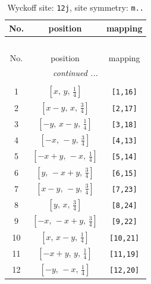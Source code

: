 \documentclass[fleqn,8pt]{jsarticle}
\begin{document}
\begin{longtable}{ccc}
\caption{Wyckoff site: {\tt 12j}, site symmetry: {\tt m..}}
 \\
 \hline \hline
No. & position & mapping \\ \hline \endfirsthead

\multicolumn{2}{l}{\tablename\ \thetable{}} \\
 \hline \hline
No. & position & mapping \\ \hline \endhead

 \hline \hline
\multicolumn{2}{r}{\footnotesize\it continued ...} \\ \endfoot

 \hline \hline
\multicolumn{2}{r}{} \\ \endlastfoot

1 & $\left[ x,\, y,\, \frac{1}{4} \right]$ & {\tt [1,16]} \\ \hline
2 & $\left[ x - y,\, x,\, \frac{3}{4} \right]$ & {\tt [2,17]} \\ \hline
3 & $\left[ - y,\, x - y,\, \frac{1}{4} \right]$ & {\tt [3,18]} \\ \hline
4 & $\left[ - x,\, - y,\, \frac{3}{4} \right]$ & {\tt [4,13]} \\ \hline
5 & $\left[ - x + y,\, - x,\, \frac{1}{4} \right]$ & {\tt [5,14]} \\ \hline
6 & $\left[ y,\, - x + y,\, \frac{3}{4} \right]$ & {\tt [6,15]} \\ \hline
7 & $\left[ x - y,\, - y,\, \frac{3}{4} \right]$ & {\tt [7,23]} \\ \hline
8 & $\left[ y,\, x,\, \frac{3}{4} \right]$ & {\tt [8,24]} \\ \hline
9 & $\left[ - x,\, - x + y,\, \frac{3}{4} \right]$ & {\tt [9,22]} \\ \hline
10 & $\left[ x,\, x - y,\, \frac{1}{4} \right]$ & {\tt [10,21]} \\ \hline
11 & $\left[ - x + y,\, y,\, \frac{1}{4} \right]$ & {\tt [11,19]} \\ \hline
12 & $\left[ - y,\, - x,\, \frac{1}{4} \right]$ & {\tt [12,20]} \\
\end{longtable}
\renewcommand{\arraystretch}{1.2}
\end{document}
